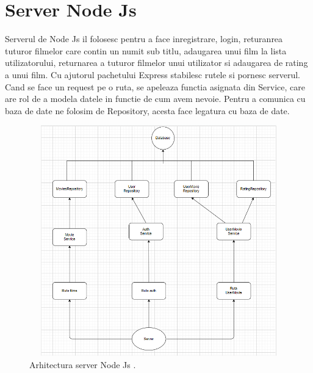 \section{Server Node Js}
\label{sec:ch5sec1}

\par Serverul de Node Js il folosesc pentru a face inregistrare, login, returanrea tuturor filmelor care contin un numit sub titlu, adaugarea unui film la lista utilizatorului, returnarea a tuturor filmelor unui utilizator si adaugarea de rating a unui film. Cu ajutorul pachetului Express stabilesc rutele si pornesc serverul. Cand se face un request pe o ruta, se apeleaza functia asignata din Service, care are rol de a modela datele in functie de cum avem nevoie. Pentru a comunica cu baza de date ne folosim de Repository, acesta face legatura cu baza de date.

		\begin{figure}[htbp]
			\centerline{\includegraphics[width=13cm, height=10cm]{figures/diagrama clase node js.png}}
			\caption{Arhitectura server Node Js .}
			\label{fig}
		\end{figure}

